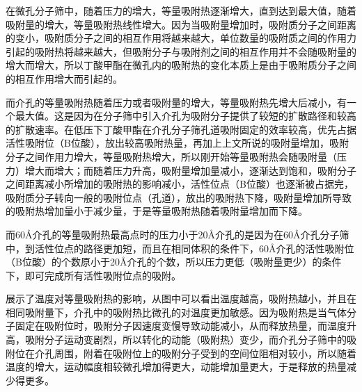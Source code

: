 \par{在微孔分子筛中，随着压力的增大，等量吸附热逐渐增大，直到达到最大值，随着吸附量的增大，等量吸附热线性增大。因为当吸附量增加时，吸附质分子之间距离的变小，吸附质分子之间的相互作用将越来越大，单位数量的吸附质之间的作用力引起的吸附热将越来越大，但吸附分子与吸附剂之间的相互作用并不会随吸附量的增大而增大，所以丁酸甲酯在微孔内的吸附热的变化本质上是由于吸附质分子之间的相互作用增大而引起的。}
\par{而介孔的等量吸附热随着压力或者吸附量的增大，等量吸附热先增大后减小，有一个最大值。这是因为在分子筛中引入介孔为吸附分子提供了较短的扩散路径和较高的扩散速率\cite{liu2012adsorption}。在低压下丁酸甲酯在介孔分子筛孔道吸附固定的效率较高，优先占据活性吸附位（B位酸），放出较高吸附热量\cite{2017介孔材料吸附气相多环芳烃实验及分子模拟研究}，再加上上文所说的吸附量增加，吸附分子之间作用力增大，等量吸附热增大，所以刚开始等量吸附热会随吸附量（压力）增大而增大；而随着压力升高，吸附量增加量减小，逐渐达到饱和，吸附分子之间距离减小所增加的吸附热的影响减小，活性位点（B位酸）也逐渐被占据完，吸附质分子转向一般的吸附位点（孔道），放出的吸附热下降，吸附量增加所导致的吸附热增加量小于减少量，于是等量吸附热随着吸附量增加而下降。}
\par{而60Å介孔的等量吸附热最高点时的压力小于20Å介孔的是因为在60Å介孔分子筛中，到活性位点的路径更加短，而且在相同体积的条件下，60Å介孔的活性吸附位（B位酸）的个数原小于20Å介孔的个数，所以压力更低（吸附量更少）的条件下，即可完成所有活性吸附位点的吸附。}


\par{展示了温度对等量吸附热的影响，从图中可以看出温度越高，吸附热越小，并且在相同吸附量下，介孔中的吸附热比微孔的对温度更加敏感。因为吸附热是当气体分子固定在吸附位时，吸附分子因速度变慢导致动能减小，从而释放热量，而温度升高，吸附分子运动变剧烈，所以转化的动能（吸附热）变少，而介孔分子筛中的吸附位在介孔周围，附着在吸附位上的吸附分子受到的空间位阻相对较小，所以随着温度的增大，运动幅度相较微孔增加得更大，动能增加量更大，于是释放的热量减少得更多。}

